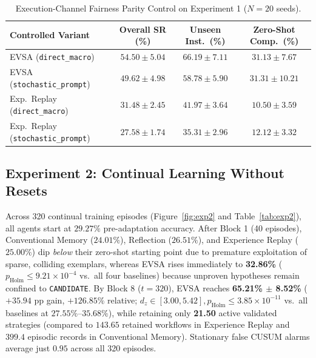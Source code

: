 \documentclass[10pt,letterpaper]{article}
\begin{document}
\begin{table}[t]
\centering
\caption{Execution-Channel Fairness Parity Control on Experiment 1 ($N=20$ seeds).}
\label{tab:fairness}
\small
\begin{tabular}{lccc}
\toprule
\textbf{Controlled Variant} & \textbf{Overall SR (\%)} & \textbf{Unseen Inst.\ (\%)} & \textbf{Zero-Shot Comp.\ (\%)} \\
\midrule
EVSA (\texttt{direct\_macro}) & $\mathbf{54.50 \pm 5.04}$ & $\mathbf{66.19 \pm 7.11}$ & $\mathbf{31.13 \pm 7.67}$ \\
EVSA (\texttt{stochastic\_prompt}) & $49.62 \pm 4.98$ & $58.78 \pm 5.90$ & $31.31 \pm 10.21$ \\
Exp.\ Replay (\texttt{direct\_macro}) & $31.48 \pm 2.45$ & $41.97 \pm 3.64$ & $10.50 \pm 3.59$ \\
Exp.\ Replay (\texttt{stochastic\_prompt}) & $27.58 \pm 1.74$ & $35.31 \pm 2.96$ & $12.12 \pm 3.32$ \\
\bottomrule
\end{tabular}
\end{table}

\subsection{Experiment 2: Continual Learning Without Resets}
Across 320 continual training episodes (Figure~\ref{fig:exp2} and Table~\ref{tab:exp2}), all agents start at $29.27\%$ pre-adaptation accuracy. After Block 1 (40 episodes), Conventional Memory ($24.01\%$), Reflection ($26.51\%$), and Experience Replay ($25.00\%$) dip \emph{below} their zero-shot starting point due to premature exploitation of sparse, colliding exemplars, whereas EVSA rises immediately to \textbf{32.86\%} ($p_{\mathrm{Holm}} \le 9.21 \times 10^{-4}$ vs.\ all four baselines) because unproven hypotheses remain confined to \texttt{CANDIDATE}. By Block 8 ($t=320$), EVSA reaches \textbf{65.21\% $\pm$ 8.52\%} ($+35.94\text{ pp}$ gain, $+126.85\%$ relative; $d_z \in [3.00, 5.42], p_{\mathrm{Holm}} \le 3.85 \times 10^{-11}$ vs.\ all baselines at $27.55\%\text{--}35.68\%$), while retaining only \textbf{21.50} active validated strategies (compared to $143.65$ retained workflows in Experience Replay and $399.4$ episodic records in Conventional Memory). Stationary false CUSUM alarms average just $0.95$ across all 320 episodes.
\end{document}
